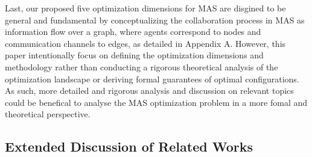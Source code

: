 Last,  our proposed five optimization dimensions for MAS are disgined to be general and fundamental by conceptualizing the collaboration process in MAS as information flow over a graph, where agents correspond to nodes and communication channels to edges, as detailed in Appendix A. However, this paper intentionally focus on defining the optimization dimensions and methodology rather than conducting a rigorous theoretical analysis of the optimization landscape or deriving formal guarantees of optimal configurations. As such, more detailed and rigorous analysis and discussion on relevant topics could be benefical to analyse the MAS optimization problem in a more fomal and theoretical perspective. 








\subsection{Extended Discussion of Related Works}\label{sec:dis_related}



